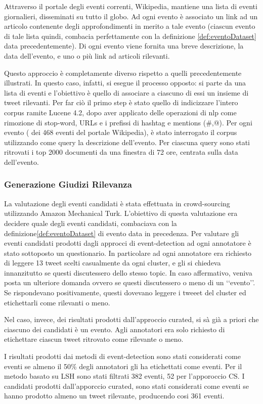 Attraverso il portale degli eventi correnti, Wikipedia, mantiene una lista di eventi giornalieri, disseminati su tutto il globo. Ad ogni evento è associato un link ad un articolo contenente degli approfondimenti in merito a tale evento (ciascun evento di tale lista quindi, combacia perfettamente con la definizione \ref {def:eventoDataset} data precedentemente). 
Di ogni evento viene fornita una breve descrizione, la data dell'evento, e uno o più link ad articoli rilevanti. 

Questo approccio è completamente diverso rispetto a quelli precedentemente illustrati. In questo caso, infatti, si esegue il processo opposto: si parte da una lista di eventi e l'obiettivo è quello di associare a ciascuno di essi un insieme di tweet rilevanti.
Per far ciò il primo step è stato quello di indicizzare l'intero corpus ramite Lucene 4.2, dopo aver applicato delle operazioni di nlp come rimozione di stop-word, URLs e i prefissi di hashtag e mentions (\#,@). 
 Per ogni evento ( dei 468 eventi del portale Wikipedia), è stato interrogato il corpus utilizzando  come query la descrizione dell'evento. Per ciascuna query sono stati ritrovati i top 2000 documenti da una finestra di 72 ore, centrata sulla data dell'evento.
\subsubsection{Generazione Giudizi Rilevanza}
La valutazione degli eventi candidati è stata effettuata in crowd-sourcing utilizzando Amazon Mechanical Turk.
L'obiettivo di questa valutazione era decidere quale degli eventi candidati, combaciava con la definizione\ref{def:eventoDataset} di evento data in precedenza.
Per valutare gli eventi candidati prodotti dagli approcci di event-detection ad ogni annotatore è stato sottoposto un questionario.
In particolare ad ogni annotatore era richiesto di leggere 13 tweet scelti casualmente da ogni cluster, e gli si chiedeva innanzitutto se questi discutessero dello stesso topic. In caso affermativo, veniva posta un ulteriore domanda ovvero se questi discutessero o meno  di un \lq\lq evento\rq\rq. Se rispondevano positivamente, questi dovevano leggere i tweeet del cluster ed etichettarli come rilevanti o meno.


Nel caso, invece, dei risultati prodotti dall'approccio curated, si sà già a priori che ciascuno dei candidati è un evento. Agli annotatori era solo richiesto di etichettare ciascun tweet ritrovato come rilevante o meno.
 
I risultati prodotti dai metodi di event-detection sono stati considerati come eventi
 se almeno il 50\% degli annotatori gli ha etichettati come eventi. Per il metodo basato su LSH sono stati filtrati 382 eventi, 52 per l'apporoccio CS.
 I candidati prodotti dall'apporccio curated, sono stati considerati come eventi se hanno prodotto almeno un tweet rilevante, producendo cosi 361 eventi.
 
